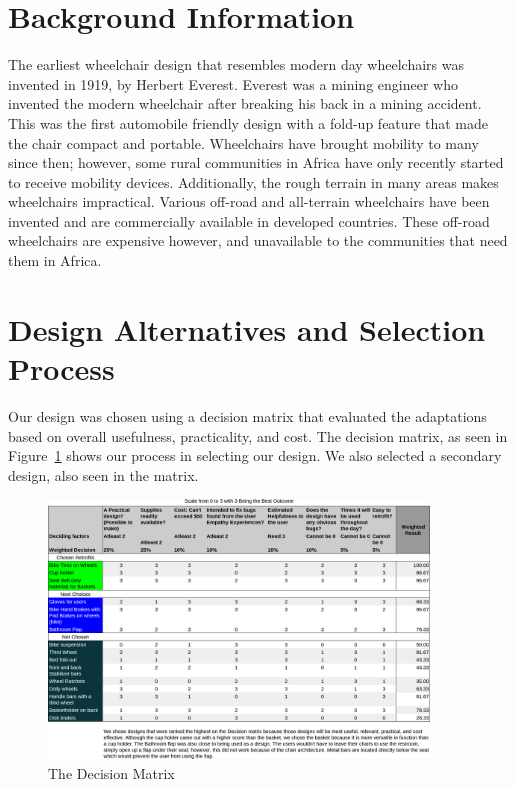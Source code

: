 \documentclass[12pt]{report}
\begin{document}
\section{Background Information}
The earliest wheelchair design that resembles modern day wheelchairs was
invented in 1919, by Herbert Everest\cite{everest-wheelchair}. Everest was a mining engineer who
invented the modern wheelchair after breaking his back in a mining
accident\cite{everest-wheelchair}. This was the first automobile
friendly design with a fold-up feature that made the chair compact and
portable. Wheelchairs have brought mobility to many since then; however, some rural communities in Africa
have only recently started to receive mobility devices. Additionally, the rough
terrain in many areas makes wheelchairs impractical. Various off-road and
all-terrain wheelchairs have been invented and are commercially available in
developed countries\cite{oxford1992all}\cite{wilmot2007off}\cite{wilmot2011off}. These off-road wheelchairs are expensive
however, and unavailable to the communities that need them in Africa.

\section{Design Alternatives and Selection Process}
Our design was chosen using
a decision matrix that evaluated the adaptations based on overall
usefulness, practicality, and cost. The decision matrix, as seen in
Figure~\ref{fig:decision-matrix} shows our process in selecting our design. We
also selected a secondary design, also seen in the matrix.

\begin{figure}
    \centering
    \includegraphics[width=0.9\textwidth]{decision-matrix}
    \caption{The Decision Matrix}
    \label{fig:decision-matrix}
\end{figure}
\end{document}
